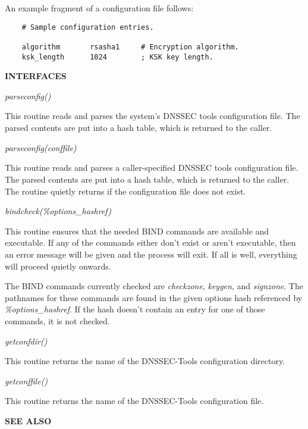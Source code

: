 An example fragment of a configuration file follows:

\begin{verbatim}
    # Sample configuration entries.

    algorithm       rsasha1     # Encryption algorithm.
    ksk_length      1024        ; KSK key length.
\end{verbatim}

{\bf INTERFACES}

\begin{description}

\item {\it parseconfig()}\verb" "

This routine reads and parses the system's DNSSEC tools configuration file.
The parsed contents are put into a hash table, which is returned to the caller.

\item {\it parseconfig(conffile)}\verb" "

This routine reads and parses a caller-specified DNSSEC tools configuration
file.  The parsed contents are put into a hash table, which is returned to
the caller.  The routine quietly returns if the configuration file does not
exist. 

\item {\it bindcheck(\%options\_hashref)}\verb" "

This routine ensures that the needed BIND commands are available and
executable.  If any of the commands either don't exist or aren't executable,
then an error message will be given and the process will exit.  If all is
well, everything will proceed quietly onwards.

The BIND commands currently checked are {\it checkzone}, {\it keygen}, and
{\it signzone}.  The pathnames for these commands are found in the given
options hash referenced by {\it \%options\_hashref}.  If the hash doesn't
contain an entry for one of those commands, it is not checked.

\item {\it getconfdir()}\verb" "

This routine returns the name of the DNSSEC-Tools configuration directory.

\item {\it getconffile()}\verb" "

This routine returns the name of the DNSSEC-Tools configuration file.

\end{description}

{\bf SEE ALSO}

